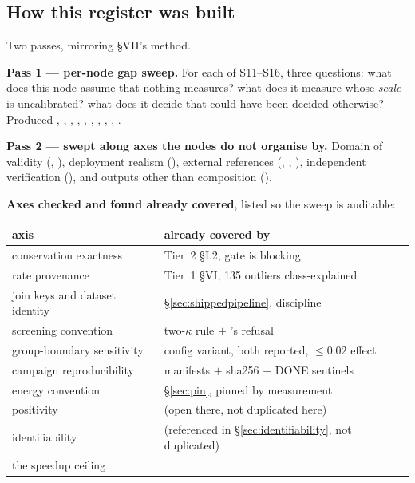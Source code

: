 \subsection{How this register was built}
\label{sec:registerbuilt}

Two passes, mirroring  \S VII's method.

\textbf{Pass 1 --- per-node gap sweep.} For each of S11--S16, three
questions: what does this node assume that nothing measures? what does it
measure whose \emph{scale} is uncalibrated? what does it decide that could
have been decided otherwise? Produced , , ,
, , , , , ,
.

\textbf{Pass 2 --- swept along axes the nodes do not organise by.} Domain of
validity (, ), deployment realism (), external
references (, , ), independent verification
(), and outputs other than composition ().

\textbf{Axes checked and found already covered}, listed so the sweep is
auditable:

\begin{center}
\begin{tabularx}{\textwidth}{@{}L{5.2cm} Y@{}}
\toprule
\textbf{axis} & \textbf{already covered by} \\
\midrule
conservation exactness & Tier~2 \S I.2, gate is blocking \\
rate provenance & Tier~1 \S VI, 135 outliers class-explained \\
join keys and dataset identity & \S\ref{sec:shippedpipeline},
   discipline \\
screening convention &  two-$\kappa$ rule $+$
  's refusal \\
group-boundary sensitivity & config variant, both reported, $\le 0.02$
  effect \\
campaign reproducibility & manifests $+$ sha256 $+$ DONE sentinels \\
energy convention & \S\ref{sec:pin}, pinned by measurement \\
positivity &  (open there, not duplicated here) \\
identifiability &  (referenced in
  \S\ref{sec:identifiability}, not duplicated) \\
the speedup ceiling &  \\
\bottomrule
\end{tabularx}
\end{center}

